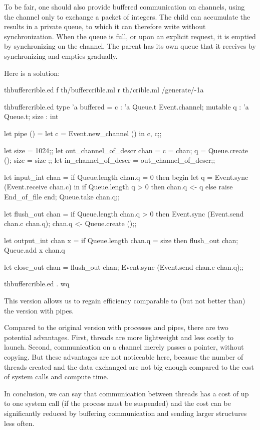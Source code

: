\begin{example}
To be fair, one should also provide buffered communication on
channels, using the channel only to exchange a packet of integers.
The child can accumulate the results in a private queue, to which it
can therefore write without synchronization.  When the queue is full,
or upon an explicit request, it is emptied by synchronizing on the
channel.  The parent has its own queue that it receives by
synchronizing and empties gradually.

Here is a solution:
%
\begin{codefile}{thbuffercrible.ed}
f th/buffercrible.ml
r th/crible.ml
/generate/-1a
\end{codefile}
%
\begin{listingcodefile}{thbuffercrible.ed}
type 'a buffered = 
    { c : 'a Queue.t Event.channel; 
      mutable q : 'a Queue.t; 
      size : int }

let pipe () = let c = Event.new_channel () in c, c;;

let size = 1024;;
let out_channel_of_descr chan = 
  { c = chan; q = Queue.create (); size = size };;
let in_channel_of_descr = out_channel_of_descr;;

let input_int chan = 
  if Queue.length chan.q = 0 then begin
    let q = Event.sync (Event.receive chan.c) in
    if Queue.length q > 0 then chan.q <- q
    else raise End_of_file
  end;
  Queue.take chan.q;;

let flush_out chan = 
  if Queue.length chan.q > 0 then Event.sync (Event.send chan.c chan.q);
  chan.q <- Queue.create ();;

let output_int chan x = 
  if Queue.length chan.q = size then flush_out chan;
  Queue.add x chan.q

let close_out chan = 
  flush_out chan;
  Event.sync (Event.send chan.c chan.q);;
\end{listingcodefile}
%
\begin{codefile}{thbuffercrible.ed}
.
wq
\end{codefile}
%
This version allows us to regain efficiency comparable to (but not
better than) the version with pipes.

Compared to the original version with processes and pipes, there are
two potential advantages. First, threads are more lightweight and less
costly to launch.  Second, communication on a channel merely passes a
pointer, without copying.  But these advantages are not noticeable
here, because the number of threads created and the data exchanged are
not big enough compared to the cost of system calls and compute time.

In conclusion, we can say that communication between threads has a
cost of up to one system call (if the process must be suspended) and
the cost can be significantly reduced by buffering communication and
sending larger structures less often.
\end{example}

